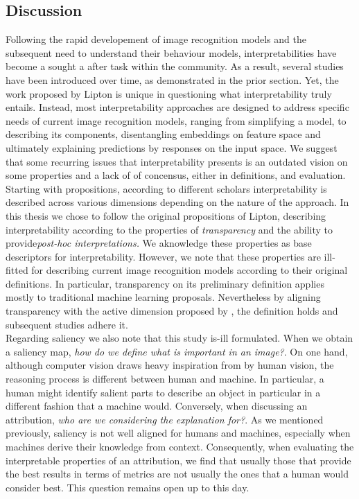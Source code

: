 \subsection{Discussion}
\label{sec:rel_interp_discussion}
Following the rapid developement of image recognition models and the subsequent need to understand 
their behaviour models, interpretabilities have become a sought a after task within the community. 
As a result, several studies have been introduced over time, as demonstrated in the prior section.
Yet, the work proposed by Lipton is unique in questioning what interpretability truly entails. 
Instead, most interpretability approaches are designed to address specific needs of current image 
recognition models, ranging from simplifying a model, to describing its components, disentangling 
embeddings on feature space and ultimately explaining predictions by responses on the input space. 
We suggest that some recurring issues that interpretability presents is an outdated vision on some 
properties and a lack of of concensus, either in definitions, and evaluation.\\

\noindent Starting with propositions, according to different scholars interpretability is described 
across various dimensions depending on the nature of the approach. In this thesis we chose to 
follow the original propositions of Lipton, describing interpretability according to the 
properties of \emph{transparency} and the ability to provide\emph{post-hoc interpretations.} We 
aknowledge these properties as base descriptors for interpretability. However, we note that these 
properties are ill-fitted for describing current image recognition models according 
to their original definitions. In particular, transparency on its preliminary definition applies 
mostly to traditional machine learning proposals. Nevertheless by aligning transparency with 
the active dimension proposed by \cite{zhang2021survey}, the definition holds and subsequent 
studies adhere it.\\

\noindent Regarding saliency we also note that this study is-ill formulated. When we obtain a 
saliency map, \emph{how do we define what is important in an image?}. On one hand, although computer  
vision draws heavy inspiration from by human vision, the reasoning process is different between 
human and machine. In particular, a human might identify salient parts to describe an object in 
particular in a different fashion that a machine would. Conversely, when discussing an attribution, 
\emph{who are we considering the explanation for?}. As we mentioned previously, saliency is not 
well aligned for humans and machines, especially when machines derive their knowledge from context. 
Consequently, when evaluating the interpretable properties of an attribution, we find that usually 
those that provide the best results in terms of metrics are not usually the ones that a human 
would consider best. This question remains open up to this day.\\

